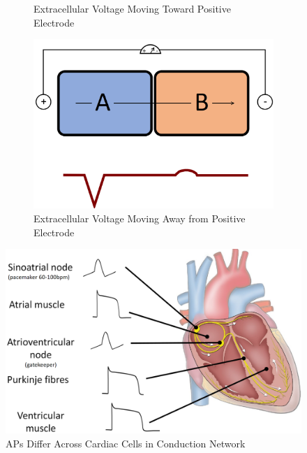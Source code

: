 \documentclass[11pt,fleqn]{book}
\begin{document}
\begin{figure}[h!]
\begin{subfigure}{0.45\textwidth}
        \caption{Extracellular Voltage Moving
Toward Positive Electrode}
    \end{subfigure}
    \begin{subfigure}{0.45\textwidth}
        \includegraphics[width=\textwidth]{Pictures/Screenshot 2024-04-03 234154.png}
        \caption{Extracellular Voltage Moving
Away from Positive Electrode}
    \end{subfigure}
    \caption{}
\end{figure}

\begin{figure}[h!]
\begin{center}
    \includegraphics[width=0.5\linewidth]{Pictures/Screenshot 2024-04-03 234821.png}
    \caption{APs Differ Across Cardiac Cells in
Conduction Network}
\end{center}
\end{figure}
\end{document}
